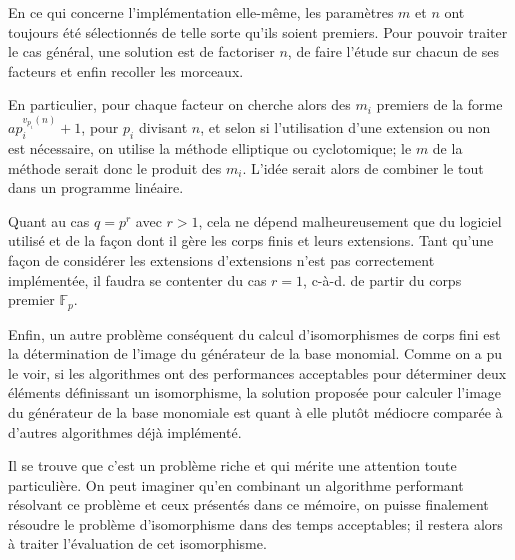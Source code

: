 \documentclass[a4paper]{article} %
\numberwithin{section}{part}
\numberwithin{equation}{section}
\newcommand\GF[1]{\mathbb{F}_{#1}}
\begin{document}
En ce qui concerne l'implémentation elle-même, les paramètres $m$ et $n$ ont 
toujours été sélectionnés de telle sorte qu'ils soient premiers. Pour pouvoir 
traiter le cas général, une solution est de factoriser $n$, de faire l'étude sur
chacun de ses facteurs et enfin recoller les morceaux.\par
En particulier, pour chaque facteur on cherche alors des $m_i$ premiers de la 
forme $ap_i^{v_{p_i}(n)} + 1$, pour $p_i$ divisant $n$, et selon si 
l'utilisation d'une extension ou non est nécessaire, on utilise la méthode 
elliptique ou cyclotomique; le $m$ de la méthode serait donc le produit des 
$m_i$. L'idée serait alors de combiner le tout dans un programme linéaire.\par
Quant au cas $q = p^r$ avec $r>1$, cela ne dépend malheureusement que du
logiciel utilisé et de la façon dont il gère les corps finis et leurs
extensions. Tant qu'une façon de considérer les extensions d'extensions 
n'est pas correctement implémentée, il faudra se contenter du cas $r = 1$,
c-à-d. de partir du corps premier $\GF{p}$.

\vspace{0.3cm}

Enfin, un autre problème conséquent du calcul d'isomorphismes de corps fini est 
la détermination de l'image du générateur de la base monomial. Comme on a pu le
voir, si les algorithmes ont des performances acceptables pour déterminer deux
éléments définissant un isomorphisme, la solution proposée pour calculer l'image
du générateur de la base monomiale est quant à elle plutôt médiocre comparée à
d'autres algorithmes déjà implémenté.\par
Il se trouve que c'est un problème riche et qui mérite une attention toute
particulière. On peut imaginer qu'en combinant un algorithme performant
résolvant ce problème et ceux présentés dans ce mémoire, on puisse finalement
résoudre le problème d'isomorphisme dans des temps acceptables; il restera alors
à traiter l'évaluation de cet isomorphisme.
\end{document}
